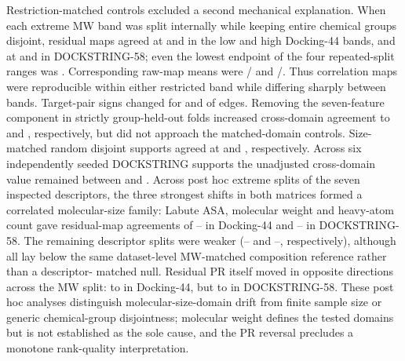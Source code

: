\documentclass[11pt]{article}
\begin{document}
Restriction-matched controls excluded a second mechanical explanation. When each extreme
MW band was split internally while keeping entire chemical groups disjoint, residual maps
agreed at \DffMWWithinLowResidualGroupDisjointMean{} and
\DffMWWithinHighResidualGroupDisjointMean{} in the low and high Docking-44 bands, and at
\DsMWWithinLowResidualGroupDisjointMean{} and
\DsMWWithinHighResidualGroupDisjointMean{} in DOCKSTRING-58; even the lowest endpoint of
the four repeated-split ranges was \DsMWWithinHighResidualGroupDisjointLow{}.
Corresponding raw-map means were
\DffMWWithinLowRawGroupDisjointMean{}/\DffMWWithinHighRawGroupDisjointMean{} and
\DsMWWithinLowRawGroupDisjointMean{}/\DsMWWithinHighRawGroupDisjointMean{}.
Thus correlation maps were reproducible within either restricted band while differing
sharply between bands. Target-pair signs
changed for \DffMWDomainSignFlip{} and \DsMWDomainSignFlip{} of edges. Removing the
seven-feature component in strictly group-held-out folds increased cross-domain agreement to
\DffMWDomainAdjusted{} and \DsMWDomainAdjusted{}, respectively, but did not approach the
matched-domain controls. Size-matched random disjoint supports agreed at
\DffMWDomainRandomControl{} and \DsMWDomainRandomControl{}, respectively. Across six
independently seeded DOCKSTRING supports the unadjusted cross-domain value remained between
\DsMWDomainSeedLow{} and \DsMWDomainSeedHigh{}. Across post hoc extreme splits of the seven inspected descriptors, the
three strongest shifts in both matrices formed a correlated molecular-size family: Labute
ASA, molecular weight and heavy-atom count gave residual-map agreements of
\DffSizeFamilyRhoLow{}--\DffSizeFamilyRhoHigh{} in Docking-44 and
\DsSizeFamilyRhoLow{}--\DsSizeFamilyRhoHigh{} in DOCKSTRING-58. The remaining descriptor
splits were weaker (\DffOtherDescriptorRhoLow{}--\DffOtherDescriptorRhoHigh{} and
\DsOtherDescriptorRhoLow{}--\DsOtherDescriptorRhoHigh{}, respectively), although all lay
below the same dataset-level MW-matched composition reference rather than a descriptor-
matched null. Residual PR itself moved in opposite directions across the MW split:
\DffMWLowDomainResidualPR{} to \DffMWHighDomainResidualPR{} in Docking-44, but
\DsMWLowDomainResidualPR{} to \DsMWHighDomainResidualPR{} in DOCKSTRING-58. These post hoc
analyses distinguish molecular-size-domain drift from finite
sample size or generic chemical-group disjointness; molecular weight defines the tested
domains but is not established as the sole cause, and the PR reversal precludes a monotone
rank-quality interpretation.
\end{document}
